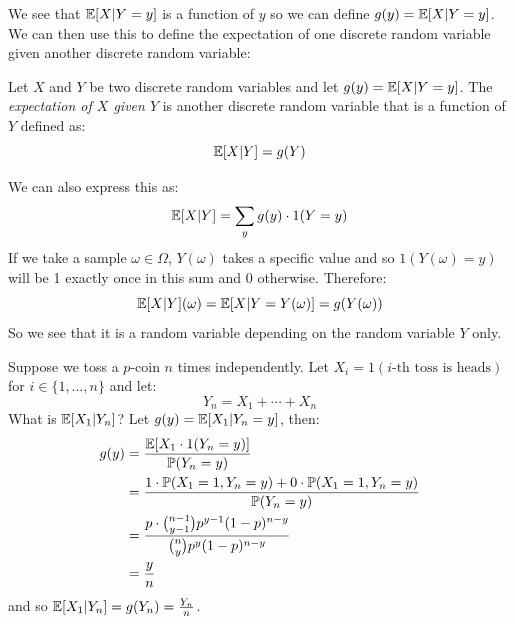 \documentclass[../main.tex]{subfiles}
\begin{document}
We see that $\mathbb{E}[X \vert Y = y]$ is a function of $y$ so we can define $g(y) = \mathbb{E}[X \vert Y = y]$.
We can then use this to define the expectation of one discrete random variable given another discrete random variable:
\begin{definition}
  Let $X$ and $Y$ be two discrete random variables and let $g(y) = \mathbb{E}[X \vert Y = y]$.
  The \textit{expectation of $X$ given $Y$} is another discrete random variable that is a function of $Y$ defined as:
  \[
    \mathbb{E}[X \vert Y] = g(Y)
  \]
\end{definition}
\begin{remark}
  We can also express this as:
  \[
    \mathbb{E}[X \vert Y] = \sum_{y} g(y) \cdot 1(Y = y)
  \]
  If we take a sample $\omega \in \Omega$, $Y(\omega)$ takes a specific value and so $1(Y(\omega) = y)$ will be 1 exactly once in this sum and 0 otherwise.
  Therefore:
  \[
    \mathbb{E}[X \vert Y](\omega) = \mathbb{E}[X \vert Y = Y(\omega)] = g(Y(\omega))
  \]
  So we see that it is a random variable depending on the random variable $Y$ only.
\end{remark}
\begin{example}
  \label{coinExpectationEx}
  Suppose we toss a $p$-coin $n$ times independently.
  Let $X_i = 1(\text{$i$-th toss is heads})$ for $i \in \{1, \ldots, n\}$ and let:
  \[
    Y_n = X_1 + \cdots + X_n
  \]
  What is $\mathbb{E}[X_1 \vert Y_n]$?
  Let $g(y) = \mathbb{E}[X_1 \vert Y_n = y]$, then:
  \begin{align*}
    g(y) &= \frac{\mathbb{E}[X_1 \cdot 1(Y_n = y)]}{\mathbb{P}(Y_n = y)} \\
         &= \frac{1 \cdot \mathbb{P}(X_1 = 1, Y_n = y) + 0 \cdot \mathbb{P}(X_1 = 1, Y_n = y)}{\mathbb{P}(Y_n = y)} \\
         &= \frac{p \cdot \binom{n - 1}{y - 1}p^{y - 1} (1 - p)^{n - y}}{\binom{n}{y} p^{y}(1-p)^{n-y}} \\
         &= \frac{y}{n}
  \end{align*}
  and so $\mathbb{E}[X_1 \vert Y_n] = g(Y_n) = \frac{Y_n}{n}$.
\end{example}
\end{document}
